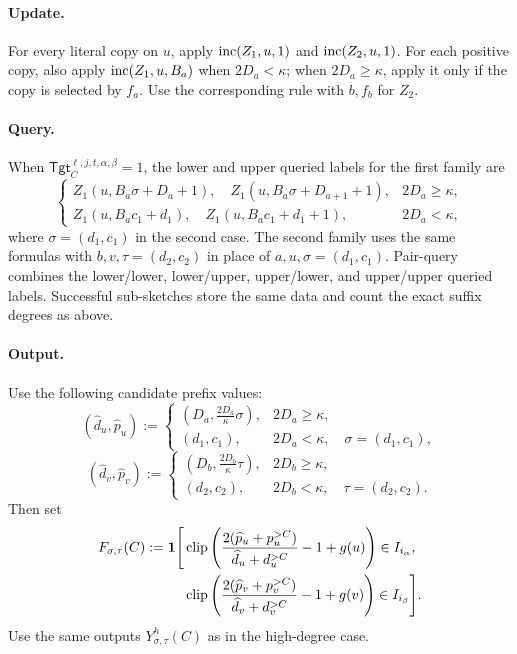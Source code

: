 \paragraph{Update.}
For every literal copy on $u$, apply $\mathrm{inc}(Z_1,u,1)$ and $\mathrm{inc}(Z_2,u,1)$.
For each positive copy, also apply $\mathrm{inc}(Z_1,u,B_a)$ when $2D_a<\kappa$; when $2D_a\ge\kappa$, apply it only if the copy is selected by $f_a$.
Use the corresponding rule with $b,f_b$ for $Z_2$.

\paragraph{Query.}
When $\mathsf{Tgt}^{\ell,j,t,\alpha,\beta}_C=1$, the lower and upper queried labels for the first family are
\[
\begin{cases}
  Z_1(u,B_a\sigma+D_a+1),\quad Z_1(u,B_a\sigma+D_{a+1}+1),&2D_a\ge\kappa,\\
  Z_1(u,B_a c_1+d_1),\quad Z_1(u,B_a c_1+d_1+1),&2D_a<\kappa,
\end{cases}
\]
where $\sigma=(d_1,c_1)$ in the second case.
The second family uses the same formulas with $b,v,\tau=(d_2,c_2)$ in place of $a,u,\sigma=(d_1,c_1)$.
Pair-query combines the lower/lower, lower/upper, upper/lower, and upper/upper queried labels.
Successful sub-sketches store the same data and count the exact suffix degrees as above.

\paragraph{Output.}
Use the following candidate prefix values:
\[
  (\widehat d_u,\widehat p_u):=\begin{cases}
    (D_a,\frac{2D_a}{\kappa}\sigma),&2D_a\ge\kappa,\\
    (d_1,c_1),&2D_a<\kappa,\quad\sigma=(d_1,c_1),
  \end{cases}
\]
\[
  (\widehat d_v,\widehat p_v):=\begin{cases}
    (D_b,\frac{2D_b}{\kappa}\tau),&2D_b\ge\kappa,\\
    (d_2,c_2),&2D_b<\kappa,\quad\tau=(d_2,c_2).
  \end{cases}
\]
Then set
\[
\begin{aligned}
  F_{\sigma,\tau}(C):=\mathbf 1\Biggl[&
  \operatorname{clip}\left(\frac{2(\widehat p_u+p_u^{>C})}{\widehat d_u+d_u^{>C}}-1+g(u)\right)\in I_{i_\alpha},\\
  &\operatorname{clip}\left(\frac{2(\widehat p_v+p_v^{>C})}{\widehat d_v+d_v^{>C}}-1+g(v)\right)\in I_{i_\beta}\Biggr].
\end{aligned}
\]
Use the same outputs $Y^h_{\sigma,\tau}(C)$ as in the high-degree case.

